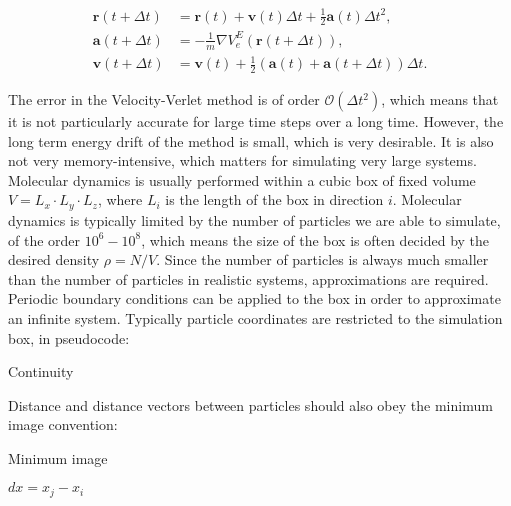 \begin{equation}
    \begin{split}
        \bm{r}(t + \Delta t)
        &= \bm{r}(t) + \bm{v}(t) \Delta t
        + \frac{1}{2} \bm{a}(t)\Delta t^2 , \\
        \bm{a}(t + \Delta t)
        &= -\frac{1}{m} \nabla V_e^E(\bm{r}(t + \Delta t)) , \\
        \bm{v}(t + \Delta t)
        &= \bm{v}(t) + \frac{1}{2}
        (\bm{a}(t) + \bm{a}(t + \Delta t)) \Delta t .
    \end{split}
\end{equation}

The error in the Velocity-Verlet method is of order
$\mathcal{O}(\Delta t^2)$, which means that it is
not particularly accurate for large time steps
over a long time. However, the long term
energy drift of the method is small, which is very desirable.
It is also not very memory-intensive, which matters
for simulating very large systems.
\newline
\newline
Molecular dynamics is usually performed within
a cubic box of fixed volume $V = L_x \cdot L_y \cdot L_z$,
where $L_i$ is the length of the box in direction $i$.
Molecular dynamics is typically limited by the number
of particles we are able to simulate, of the order
$10^6 - 10^8$, which means the size of the box
is often decided by the desired density $\rho = N / V$.
Since the number of particles is always much smaller
than the number of particles in realistic systems,
approximations are required. Periodic boundary conditions
can be applied to the box in order to approximate
an infinite system. Typically particle coordinates are restricted
to the simulation box, in pseudocode:

\begin{algorithm}[H]
\caption{Continuity}
    \begin{algorithmic}
        \EndIf
        \EndIf
    \end{algorithmic}
\end{algorithm}

Distance and distance vectors between particles
should also obey the minimum image convention:

\begin{algorithm}[H]
\caption{Minimum image}
    \begin{algorithmic}
        \State $dx = x_j - x_i$
        \EndIf
        \EndIf
    \end{algorithmic}
\end{algorithm}

